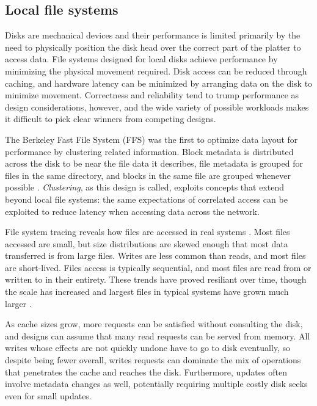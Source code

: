 \subsection{Local file systems}

Disks are mechanical devices and their performance is limited primarily by the need to physically position the disk head over the correct part of the platter to access data. File systems designed for local disks achieve performance by minimizing the physical movement required. Disk access can be reduced through caching, and hardware latency can be minimized by arranging data on the disk to minimize movement. Correctness and reliability tend to trump performance as design considerations, however, and the wide variety of possible workloads makes it difficult to pick clear winners from competing designs.

The Berkeley Fast File System (FFS) was the first to optimize data layout for performance by clustering related information. Block metadata is distributed across the disk to be near the file data it describes, file metadata is grouped for files in the same directory, and blocks in the same file are grouped whenever possible \cite{mckusick}. \emph{Clustering}, as this design is called, exploits concepts that extend beyond local file systems: the same expectations of correlated access can be exploited to reduce latency when accessing data across the network.

File system tracing reveals how files are accessed in real systems \cite{ousterhout}. Most files accessed are small, but size distributions are skewed enough that most data transferred is from large files. Writes are less common than reads, and most files are short-lived. Files access is typically sequential, and most files are read from or written to in their entirety. These trends have proved resiliant over time, though the scale has increased and largest files in typical systems have grown much larger \cite{ruemmler,gibson98b}.

As cache sizes grow, more requests can be satisfied without consulting the disk, and designs can assume that many read requests can be served from memory. All writes whose effects are not quickly undone have to go to disk eventually, so despite being fewer overall, writes requests can dominate the mix of operations that penetrates the cache and reaches the disk. Furthermore, updates often involve metadata changes as well, potentially requiring multiple costly disk seeks even for small updates.

